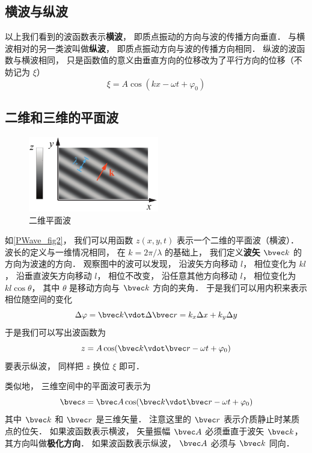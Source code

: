 \subsection{横波与纵波}
以上我们看到的波函数表示\textbf{横波}， 即质点振动的方向与波的传播方向垂直． 与横波相对的另一类波叫做\textbf{纵波}， 即质点振动方向与波的传播方向相同． 纵波的波函数与横波相同， 只是函数值的意义由垂直方向的位移改为了平行方向的位移（不妨记为 $\xi$）
\begin{equation}
\xi = A \cos(k x - \omega t + \varphi_0)
\end{equation}

\subsection{二维和三维的平面波}

\begin{figure}[ht]
\centering
\includegraphics[width=5.7cm]{./figures/PWave_2.pdf}
\caption{二维平面波} \label{PWave_fig2}
\end{figure}

如\autoref{PWave_fig2}， 我们可以用函数 $z(x,y,t)$ 表示一个二维的平面波（横波）． 波长的定义与一维情况相同， 在 $k = 2\pi/\lambda$ 的基础上， 我们定义\textbf{波矢} $\bvec k$ 的方向为波速的方向．
观察图中的波可以发现， 沿波矢方向移动 $l$， 相位变化为 $kl$， 沿垂直波矢方向移动 $l$， 相位不改变， 沿任意其他方向移动 $l$， 相位变化为 $kl\cos\theta$， 其中 $\theta$ 是移动方向与 $\bvec k$ 方向的夹角． 于是我们可以用内积来表示相位随空间的变化
\begin{equation}
\Delta\varphi = \bvec k \vdot \Delta\bvec r = k_x \Delta x + k_y \Delta y
\end{equation}
于是我们可以写出波函数为
\begin{equation}\label{PWave_eq8}
z = A \cos(\bvec k \vdot \bvec r - \omega t + \varphi_0)
\end{equation}
要表示纵波， 同样把 $z$ 换位 $\xi$ 即可．

类似地， 三维空间中的平面波可表示为
\begin{equation}
\bvec s = \bvec A \cos(\bvec k \vdot \bvec r - \omega t + \varphi_0)
\end{equation}
其中 $\bvec k$ 和 $\bvec r$ 是三维矢量． 注意这里的 $\bvec r$ 表示介质静止时某质点的位矢． 如果波函数表示横波， 矢量振幅 $\bvec A$ 必须垂直于波矢 $\bvec k$， 其方向叫做\textbf{极化方向}． 如果波函数表示纵波， $\bvec A$ 必须与 $\bvec k$ 同向．

